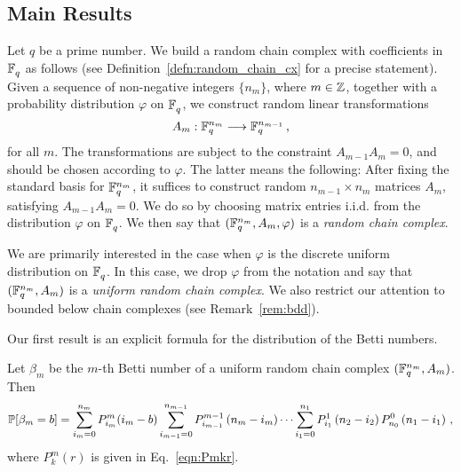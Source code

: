 
\subsection*{Main Results}
Let $q$ be a prime number.  We
build a random chain complex with coefficients in $\mathbb{F}_q^{}$ as follows (see
Definition~\ref{defn:random_chain_cx} for a precise statement). Given a
sequence of non-negative integers $\{n_m\}$, where $m \in \mathbb{Z}$, together with a probability
distribution $\varphi$ on $\mathbb{F}_q^{}$, we construct random
linear transformations 
\[
  A_m : \mathbb{F}_q^{n_m} \longrightarrow \mathbb{F}_q^{n_{m-1}} \, ,
\]
for all $m$. The transformations are subject to the constraint $A_{m-1} A_m =
0$, and should be chosen according to $\varphi$. The latter means the
following: After fixing the standard basis for $\mathbb{F}_q^{n_m}$, it suffices to
construct random $n_{m-1} \times n_m$ matrices $A_m$, satisfying $A_{m-1}A_m =
0$. We do so by choosing matrix entries i.i.d. from the distribution $\varphi$
on $\mathbb{F}_q^{}$. We then say that $(\mathbb{F}_q^{n_m}, A_m, \varphi)$ is a {\em random
chain complex}. 

We are primarily interested in the case when $\varphi$ is the discrete uniform
distribution on $\mathbb{F}_q^{}$. In this case, we drop $\varphi$ from the notation and
say that $(\mathbb{F}_q^{n_m}, A_m)$ is a {\em uniform random chain complex}. We also
restrict our attention to bounded below chain complexes (see Remark~\ref{rem:bdd}). 


Our first result is an explicit formula for the distribution
of the Betti numbers.
\begin{bigthm} 
  \label{thm:bettinum}
  Let $\beta_m$ be the $m$-th Betti number of a uniform random chain complex
  $(\mathbb{F}_q^{n_m} , A_m)$. Then
  \[    
    \mathbb{P}[\beta_m = b] = \sum_{i_m=0}^{n_{m}} P_{i_m}^{m}(i_m-b)
    \sum_{i_{m-1}=0}^{n_{m-1}} P_{i_{m-1}}^{m-1}\left(n_{m} -i_m\right) \cdots
    \sum_{i_1 = 0}^{n_1} P_{i_1}^1\left(n_2 - i_2\right) P_{n_0}^0 \left(n_1 - i_1\right) \, ,
  \]
  where $P^m_k(r)$ is given in Eq.~\eqref{eqn:Pmkr}.
\end{bigthm}

